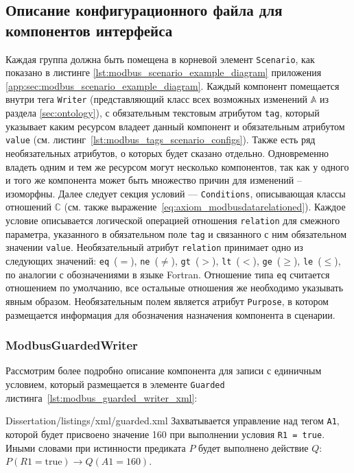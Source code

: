 \subsection{Описание конфигурационного файла для компонентов интерфейса \mbwriter}
Каждая группа должна быть помещена в корневой элемент \texttt{Scenario},
как показано в листинге \ref{lst:modbus_scenario_example_diagram} приложения \ref{app:sec:modbus_scenario_example_diagram}.
%
Каждый компонент помещается внутри тега \texttt{Writer} (представляющий класс всех возможных изменений $\mathbb{A}$ из раздела \ref{sec:ontology}),
с обязательным текстовым атрибутом \texttt{tag}, который указывает каким ресурсом владеет данный компонент
и обязательным атрибутом \texttt{value} (см. листинг~\ref{lst:modbus_tags_scenario_configs}).
Также есть ряд необязательных атрибутов, о которых будет сказано отдельно. 
Одновременно владеть одним и тем же ресурсом могут несколько компонентов,
так как у одного и того же компонента может быть множество причин для изменений -- изоморфны.
Далее следует секция условий --- \texttt{Conditions},
описывающая классы отношений $\mathbb{C}$ (см. также выражение~\eqref{eq:axiom_modbusdatarelationed}).
Каждое условие описывается логической операцией отношения \texttt{relation} для смежного параметра,
указанного в обязательном поле \texttt{tag} и связанного с ним обязательном значении \texttt{value}.
Необязательный атрибут \texttt{relation} принимает одно из следующих значений:
\texttt{eq}~($=$),
\texttt{ne}~($\neq$),
\texttt{gt}~($>$),
\texttt{lt}~($<$),
\texttt{ge}~($\geq$),
\texttt{le}~($\leq$), по аналогии с обозначениями в языке Fortran.
Отношение типа \texttt{eq} считается отношением по умолчанию,
все остальные отношения же необходимо указывать явным образом.
Необязательным полем является атрибут \texttt{Purpose}, в котором размещается информация для
обозначения назначения компонента в сценарии. 


\subsubsection{ModbusGuardedWriter}
Рассмотрим более подробно описание компонента для записи с единичным условием,
который размещается в элементе \texttt{Guarded} листинга~\ref{lst:modbus_guarded_writer_xml}:

        {Dissertation/listings/xml/guarded.xml}
Захватывается управление над тегом \texttt{A1}, которой будет присвоено значение 160
при выполнении условия \texttt{R1 = true}.
Иными словами при истинности предиката $P$ будет выполнено действие $Q$:
$P(R1=\mbox{true}) \to Q(A1=160)$.


